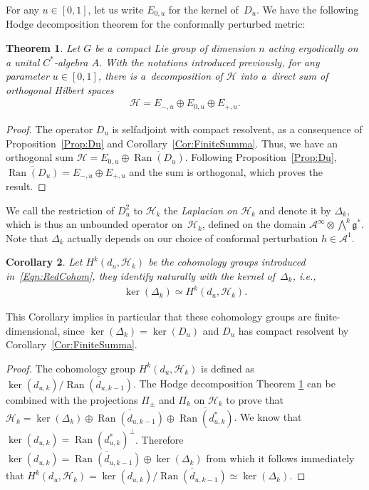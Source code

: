 \documentclass[pdftex]{sigma}
\newtheorem{Theorem}{Theorem}[section]
\newtheorem{Corollary}[Theorem]{Corollary}
\newcommand{\Aa}{\mathcal{A}}
\newcommand{\Complex}[1][]{(d_{#1}, \Hh_k)}
\newcommand{\Hh}{\mathscr{H}}
\newcommand{\LieG}{\mathfrak{g}}
\DeclareMathOperator{\Ran}{Ran}
\numberwithin{equation}{section}
\begin{document}
For any $u \in [0,1]$, let us write $E_{0,u}$ for the kernel of~$D_u$. We have the following Hodge decomposition theorem for the conformally perturbed metric:
\begin{Theorem}
\label{Thm:HodgeDecomp}
Let $G$ be a \emph{compact} Lie group of dimension $n$ acting \emph{ergodically} on a unital $C^*$-algebra $A$. With the notations introduced previously, for any parameter $u \in [0,1]$, there is a~decomposition of $\Hh$ into a~direct sum of orthogonal Hilbert spaces
\begin{gather*}
\Hh = E_{-,u} \oplus E_{0,u} \oplus E_{+,u}.
\end{gather*}
\end{Theorem}

\begin{proof}
The operator $D_u$ is selfadjoint with compact resolvent, as a consequence of Proposition~\ref{Prop:Du} and Corollary~\ref{Cor:FiniteSumma}. Thus, we have an orthogonal sum $\Hh = E_{0,u} \oplus \overline{\Ran(D_u)}$. Following Proposition~\ref{Prop:Du}, $\overline{\Ran(D_u)} = E_{-,u} \oplus E_{+,u}$ and the sum is orthogonal, which proves the result.
\end{proof}

We call the restriction of $D_u^2$ to $\Hh_k$ the \emph{Laplacian on $\Hh_k$} and denote it by $\Delta_k$, which is thus an unbounded operator on~$\Hh_k$, def\/ined on the domain $\Aa^\infty \otimes \bigwedge^k \LieG^*$. Note that $\Delta_k$ actually depends on our choice of conformal perturbation $h \in \Aa^1$.

\begin{Corollary}
\label{Cor:CohomGp}
Let $H^k\Complex[u]$ be the cohomology groups introduced in~\eqref{Eqn:RedCohom}, they identify naturally with the kernel of~$\Delta_k$, i.e.,
\begin{gather*}
\ker(\Delta_k) \simeq H^k\Complex[u].
\end{gather*}
\end{Corollary}

\begin{Remark}
\label{remarkfinitedimensionalityofcoh}
This Corollary implies in particular that these cohomology groups are f\/inite-dimensional, since $\ker(\Delta_k) = \ker(D_u)$ and $D_u$ has compact resolvent by Corollary~\ref{Cor:FiniteSumma}.
\end{Remark}

\begin{proof}
The cohomology group $H^k\Complex[u]$ is def\/ined as $\ker(d_{u, k})/\overline{\Ran(d_{u, k-1})}$. The Hodge decomposition Theorem \ref{Thm:HodgeDecomp} can be combined with the projections $\Pi_\pm$ and $\Pi_k$ on $\Hh_k$ to prove that $\Hh_k = \ker(\Delta_k) \oplus \overline{\Ran(d_{u,k-1})} \oplus \overline{\Ran(d_{u, k}^*)}$. We know that $\ker(d_{u, k}) = \Ran(d_{u,k}^*)^\perp$. Therefore $\ker(d_{u,k}) = \overline{\Ran(d_{u,k-1})} \oplus \ker(\Delta_k)$ from which it follows immediately that $H^k\Complex[u] = \ker(d_{u,k})/\overline{\Ran(d_{u,k-1})} \simeq \ker(\Delta_k)$.
\end{proof}
\end{document}
